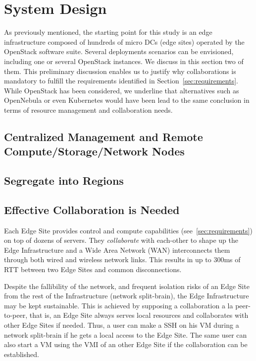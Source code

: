 


\section{System Design}
\label{sec:system_design_considerations}
As previously mentioned, the starting point for this study is an edge
infrastructure composed of hundreds of micro DCs (\aka edge sites)
operated by the OpenStack software suite.  Several deployments
scenarios can be envisioned, including one or several OpenStack
instances.  We discuss in this section two of them. This preliminary
discussion enables us to justify why collaborations is mandatory to
fulfill the requirements identified in Section~\ref{sec:requirements}.
While OpenStack has been considered, we underline that alternatives
such as OpenNebula or even Kubernetes would have been lead to the same
conclusion in terms of resource management and collaboration needs.

\subsection{Centralized Management and Remote Compute/Storage/Network Nodes}
\label{subsec:centralized_os}


\subsection{Segregate into Regions}


\subsection{Effective Collaboration is Needed}
Each Edge Site
provides control and compute capabilities (see~\ref{sec:requirements})
on top of dozens of servers. They \emph{collaborate} with each-other
to shape up the Edge Infrastructure and a Wide Area Network (WAN)
interconnects them through both wired and wireless network links. This
results in up to 300ms of RTT between two Edge Sites and common
disconnections.

Despite the fallibility of the network, and frequent isolation risks
of an Edge Site from the rest of the Infrastructure (\ie network
split-brain), the Edge Infrastructure may be kept sustainable. This is
achieved by supposing a collaboration a la peer-to-peer, that is, an
Edge Site always serves local resources and collaborates with other
Edge Sites if needed. Thus, a user can make a SSH on his VM during a
network split-brain if he gets a local access to the Edge Site. The
same user can also start a VM using the VMI of an other Edge Site if
the collaboration can be established.

